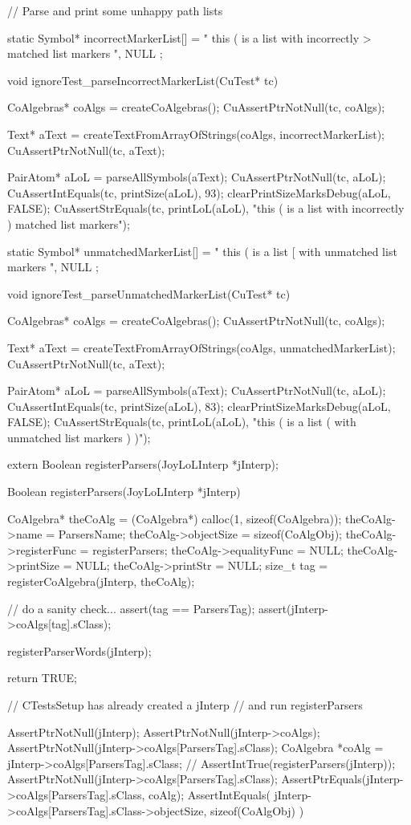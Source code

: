 // Parse and print some unhappy path lists

static Symbol* incorrectMarkerList[] = {
  " this ( is a list with incorrectly > matched list markers ",
  NULL
};

void ignoreTest_parseIncorrectMarkerList(CuTest* tc) {
  CoAlgebras* coAlgs = createCoAlgebras();
  CuAssertPtrNotNull(tc, coAlgs);

  Text* aText = createTextFromArrayOfStrings(coAlgs, incorrectMarkerList);
  CuAssertPtrNotNull(tc, aText);

  PairAtom* aLoL = parseAllSymbols(aText);
  CuAssertPtrNotNull(tc, aLoL);
  CuAssertIntEquals(tc, printSize(aLoL), 93);
  clearPrintSizeMarksDebug(aLoL, FALSE);
  CuAssertStrEquals(tc, printLoL(aLoL),
    "this ( is a list with incorrectly ) matched list markers");
}

static Symbol* unmatchedMarkerList[] = {
  " this ( is a list [ with unmatched list markers ",
  NULL
};

void ignoreTest_parseUnmatchedMarkerList(CuTest* tc) {
  CoAlgebras* coAlgs = createCoAlgebras();
  CuAssertPtrNotNull(tc, coAlgs);

  Text* aText = createTextFromArrayOfStrings(coAlgs, unmatchedMarkerList);
  CuAssertPtrNotNull(tc, aText);

  PairAtom* aLoL = parseAllSymbols(aText);
  CuAssertPtrNotNull(tc, aLoL);
  CuAssertIntEquals(tc, printSize(aLoL), 83);
  clearPrintSizeMarksDebug(aLoL, FALSE);
  CuAssertStrEquals(tc, printLoL(aLoL),
    "this ( is a list ( with unmatched list markers ) )");
}
\stoptyping

\startTestSuite[registerParsers]

\startCHeader
extern Boolean registerParsers(JoyLoLInterp *jInterp);
\stopCHeader
{}

\startCCode
Boolean registerParsers(JoyLoLInterp *jInterp) {
  CoAlgebra* theCoAlg    = (CoAlgebra*) calloc(1, sizeof(CoAlgebra));
  theCoAlg->name         = ParsersName;
  theCoAlg->objectSize   = sizeof(CoAlgObj);
  theCoAlg->registerFunc = registerParsers;
  theCoAlg->equalityFunc = NULL;
  theCoAlg->printSize    = NULL;
  theCoAlg->printStr     = NULL;
  size_t tag = registerCoAlgebra(jInterp, theCoAlg);
  
  // do a sanity check...
  assert(tag == ParsersTag);
  assert(jInterp->coAlgs[tag].sClass);
  
  registerParserWords(jInterp);
    
  return TRUE;
}
\stopCCode


\startCTest
  // CTestsSetup has already created a jInterp
  // and run registerParsers
  
  AssertPtrNotNull(jInterp);
  AssertPtrNotNull(jInterp->coAlgs);
  AssertPtrNotNull(jInterp->coAlgs[ParsersTag].sClass);
  CoAlgebra *coAlg = jInterp->coAlgs[ParsersTag].sClass;
//  AssertIntTrue(registerParsers(jInterp));
  AssertPtrNotNull(jInterp->coAlgs[ParsersTag].sClass);
  AssertPtrEquals(jInterp->coAlgs[ParsersTag].sClass, coAlg);
  AssertIntEquals(
    jInterp->coAlgs[ParsersTag].sClass->objectSize,
    sizeof(CoAlgObj)
  )
\stopCTest
\stopTestCase
\stopTestSuite

